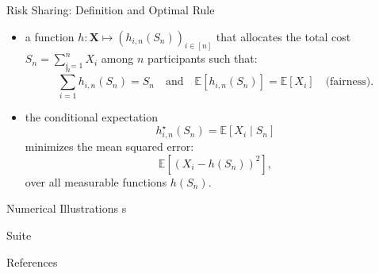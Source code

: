 \documentclass[11pt,xcolor={dvipsnames},hyperref={pdftex,pdfpagemode=UseNone,hidelinks,pdfdisplaydoctitle=true},usepdftitle=false]{beamer}
\begin{document}
\begin{frame}{Risk Sharing: Definition and Optimal Rule}
    \begin{itemize}
        \item {} a function $h: \boldsymbol{X} \mapsto (h_{i,n}(S_n))_{i \in [n]}$ that allocates the total cost $S_n = \sum_{i=1}^n X_i$ among $n$ participants such that:
        \begin{equation*}
        \sum_{i=1}^n h_{i,n}(S_n) = S_n
        \quad \text{and} \quad
        \mathbb{E}[h_{i,n}(S_n)] = \mathbb{E}[X_i] \quad \text{(fairness)}.
        \end{equation*}
        \pause
        \item {} the conditional expectation
        \begin{equation*}
        h_{i,n}^{\star}(S_n) = \mathbb{E}[X_i \mid S_n]
        \end{equation*}
        minimizes the mean squared error:
        \begin{equation*}
        \mathbb{E}\left[(X_i - h(S_n))^2\right],
        \end{equation*}
        over all measurable functions $h(S_n)$.
    \end{itemize}
\end{frame}

\begin{frame}{Numerical Illustrations}
    s
\end{frame}

\begin{frame}{Suite}
    
\end{frame}

\appendix

\begin{frame}[allowframebreaks]{References}


\end{frame}


\end{document}
